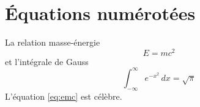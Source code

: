 \documentclass{article}
\begin{document}
\hsize=380pt
\section{\'Equations num\'erot\'ees}
La relation masse-\'energie
\begin{equation}\label{eq:emc}
E = m c^2
\end{equation}
et l'int\'egrale de Gauss
\begin{equation}
\int_{-\infty}^{\infty} e^{-x^2}\,dx = \sqrt{\pi}
\end{equation}
L'\'equation \eqref{eq:emc} est c\'el\`ebre.
\end{document}
